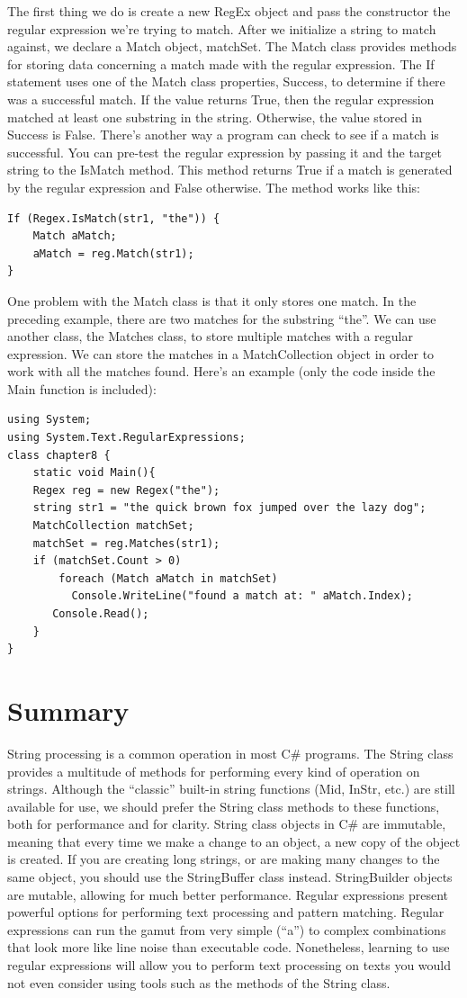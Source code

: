 \documentclass[12pt,a4paper,final,twoside,titlepage]{book}
\begin{document}
The first thing we do is create a new RegEx object and pass the constructor the regular expression we’re trying to match. After we initialize a string to match against, we declare a Match object, matchSet. The Match class provides methods for storing data concerning a match made with the regular expression. The If statement uses one of the Match class properties, Success, to determine if there was a successful match. If the value returns True, then the regular expression matched at least one substring in the string. Otherwise, the value stored in Success is False. There’s another way a program can check to see if a match is successful. You can pre-test the regular expression by passing it and the target string to the IsMatch method. This method returns True if a match is generated by the regular expression and False otherwise. The method works like this:
\begin{lstlisting}
If (Regex.IsMatch(str1, "the")) { 
	Match aMatch;
    aMatch = reg.Match(str1);
}
\end{lstlisting}
One problem with the Match class is that it only stores one match. In the preceding example, there are two matches for the substring “the”. We can use another class, the Matches class, to store multiple matches with a regular expression. We can store the matches in a MatchCollection object in order to work with all the matches found. Here’s an example (only the code inside the Main function is included):
\begin{lstlisting}
using System;
using System.Text.RegularExpressions;
class chapter8 {
	static void Main(){
	Regex reg = new Regex("the");
	string str1 = "the quick brown fox jumped over the lazy dog";
	MatchCollection matchSet;
	matchSet = reg.Matches(str1);
	if (matchSet.Count > 0)
   		foreach (Match aMatch in matchSet)
          Console.WriteLine("found a match at: " aMatch.Index);
       Console.Read();
	}
}
\end{lstlisting}
\section{Summary}
String processing is a common operation in most C\# programs. The String class provides a multitude of methods for performing every kind of operation on strings. Although the “classic” built-in string functions (Mid, InStr, etc.) are still available for use, we should prefer the String class methods to these functions, both for performance and for clarity. String class objects in C\# are immutable, meaning that every time we make a change to an object, a new copy of the object is created. If you are creating long strings, or are making many changes to the same object, you should use the StringBuffer class instead. StringBuilder objects are mutable, allowing for much better performance. Regular expressions present powerful options for performing text processing and pattern matching. Regular expressions can run the gamut from very simple (“a”) to complex combinations that look more like line noise than executable code. Nonetheless, learning to use regular expressions will allow you to perform text processing on texts you would not even consider using tools such as the methods of the String class.
\end{document}
